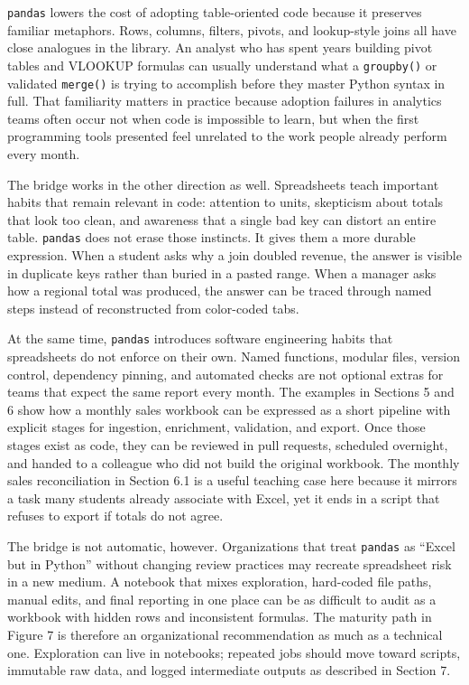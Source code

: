\documentclass[
  12pt,
]{article}
\begin{document}
\texttt{pandas} lowers the cost of adopting table-oriented code because
it preserves familiar metaphors. Rows, columns, filters, pivots, and
lookup-style joins all have close analogues in the library. An analyst
who has spent years building pivot tables and VLOOKUP formulas can
usually understand what a \texttt{groupby()} or validated
\texttt{merge()} is trying to accomplish before they master Python
syntax in full. That familiarity matters in practice because adoption
failures in analytics teams often occur not when code is impossible to
learn, but when the first programming tools presented feel unrelated to
the work people already perform every month.

The bridge works in the other direction as well. Spreadsheets teach
important habits that remain relevant in code: attention to units,
skepticism about totals that look too clean, and awareness that a single
bad key can distort an entire table. \texttt{pandas} does not erase
those instincts. It gives them a more durable expression. When a student
asks why a join doubled revenue, the answer is visible in duplicate keys
rather than buried in a pasted range. When a manager asks how a regional
total was produced, the answer can be traced through named steps instead
of reconstructed from color-coded tabs.

At the same time, \texttt{pandas} introduces software engineering habits
that spreadsheets do not enforce on their own. Named functions, modular
files, version control, dependency pinning, and automated checks are not
optional extras for teams that expect the same report every month. The
examples in Sections 5 and 6 show how a monthly sales workbook can be
expressed as a short pipeline with explicit stages for ingestion,
enrichment, validation, and export. Once those stages exist as code,
they can be reviewed in pull requests, scheduled overnight, and handed
to a colleague who did not build the original workbook. The monthly
sales reconciliation in Section 6.1 is a useful teaching case here
because it mirrors a task many students already associate with Excel,
yet it ends in a script that refuses to export if totals do not agree.

The bridge is not automatic, however. Organizations that treat
\texttt{pandas} as ``Excel but in Python'' without changing review
practices may recreate spreadsheet risk in a new medium. A notebook that
mixes exploration, hard-coded file paths, manual edits, and final
reporting in one place can be as difficult to audit as a workbook with
hidden rows and inconsistent formulas. The maturity path in Figure 7 is
therefore an organizational recommendation as much as a technical one.
Exploration can live in notebooks; repeated jobs should move toward
scripts, immutable raw data, and logged intermediate outputs as
described in Section 7.
\end{document}
